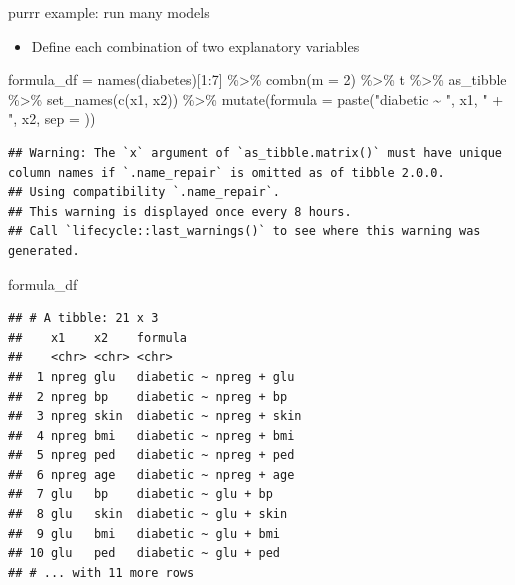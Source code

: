 \documentclass[
  ignorenonframetext,
]{beamer}
\newenvironment{Shaded}{\begin{snugshade}}{\end{snugshade}}
\newcommand{\AttributeTok}[1]{\textcolor[rgb]{0.77,0.63,0.00}{#1}}
\newcommand{\DecValTok}[1]{\textcolor[rgb]{0.00,0.00,0.81}{#1}}
\newcommand{\FunctionTok}[1]{\textcolor[rgb]{0.00,0.00,0.00}{#1}}
\newcommand{\NormalTok}[1]{#1}
\newcommand{\OtherTok}[1]{\textcolor[rgb]{0.56,0.35,0.01}{#1}}
\newcommand{\SpecialCharTok}[1]{\textcolor[rgb]{0.00,0.00,0.00}{#1}}
\newcommand{\StringTok}[1]{\textcolor[rgb]{0.31,0.60,0.02}{#1}}
\providecommand{\tightlist}{%
  \setlength{\itemsep}{0pt}\setlength{\parskip}{0pt}}
\begin{document}
\begin{frame}[fragile]{purrr example: run many models}
\protect\hypertarget{purrr-example-run-many-models}{}
\begin{itemize}
\tightlist
\item
  Define each combination of two explanatory variables
\end{itemize}

\begin{Shaded}
\begin{Highlighting}[]
\NormalTok{formula\_df }\OtherTok{=} \FunctionTok{names}\NormalTok{(diabetes)[}\DecValTok{1}\SpecialCharTok{:}\DecValTok{7}\NormalTok{] }\SpecialCharTok{\%\textgreater{}\%} 
  \FunctionTok{combn}\NormalTok{(}\AttributeTok{m =} \DecValTok{2}\NormalTok{) }\SpecialCharTok{\%\textgreater{}\%} 
\NormalTok{  t }\SpecialCharTok{\%\textgreater{}\%} 
\NormalTok{  as\_tibble }\SpecialCharTok{\%\textgreater{}\%} 
  \FunctionTok{set\_names}\NormalTok{(}\FunctionTok{c}\NormalTok{(}\StringTok{\textquotesingle{}x1\textquotesingle{}}\NormalTok{, }\StringTok{\textquotesingle{}x2\textquotesingle{}}\NormalTok{)) }\SpecialCharTok{\%\textgreater{}\%} 
  \FunctionTok{mutate}\NormalTok{(}\AttributeTok{formula =} \FunctionTok{paste}\NormalTok{(}\StringTok{"diabetic \textasciitilde{} "}\NormalTok{, x1, }\StringTok{" + "}\NormalTok{, x2, }\AttributeTok{sep =} \StringTok{\textquotesingle{}\textquotesingle{}}\NormalTok{))}
\end{Highlighting}
\end{Shaded}

\begin{verbatim}
## Warning: The `x` argument of `as_tibble.matrix()` must have unique column names if `.name_repair` is omitted as of tibble 2.0.0.
## Using compatibility `.name_repair`.
## This warning is displayed once every 8 hours.
## Call `lifecycle::last_warnings()` to see where this warning was generated.
\end{verbatim}

\begin{Shaded}
\begin{Highlighting}[]
\NormalTok{formula\_df}
\end{Highlighting}
\end{Shaded}

\begin{verbatim}
## # A tibble: 21 x 3
##    x1    x2    formula                
##    <chr> <chr> <chr>                  
##  1 npreg glu   diabetic ~ npreg + glu 
##  2 npreg bp    diabetic ~ npreg + bp  
##  3 npreg skin  diabetic ~ npreg + skin
##  4 npreg bmi   diabetic ~ npreg + bmi 
##  5 npreg ped   diabetic ~ npreg + ped 
##  6 npreg age   diabetic ~ npreg + age 
##  7 glu   bp    diabetic ~ glu + bp    
##  8 glu   skin  diabetic ~ glu + skin  
##  9 glu   bmi   diabetic ~ glu + bmi   
## 10 glu   ped   diabetic ~ glu + ped   
## # ... with 11 more rows
\end{verbatim}
\end{frame}
\end{document}
